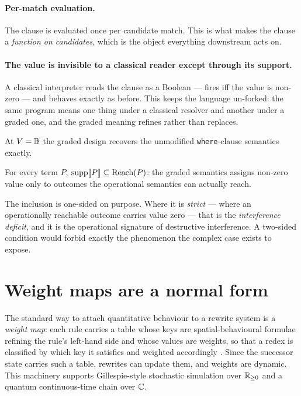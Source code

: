 \paragraph{Per-match evaluation.} The clause is evaluated once per candidate
match. This is what makes the clause a \emph{function on candidates}, which is the
object everything downstream acts on.

\paragraph{The value is invisible to a classical reader except through its
support.} A classical interpreter reads the clause as a Boolean --- fires iff the
value is non-zero --- and behaves exactly as before. This keeps the language
un-forked: the same program means one thing under a classical resolver and
another under a graded one, and the graded meaning refines rather than replaces.

\begin{theorem}[Conservativity]
\label{thm:conservativity}
At $V = \mathbb{B}$ the graded design recovers the unmodified \texttt{where}-clause
semantics exactly.
\end{theorem}

\begin{corollary}
\label{cor:support}
For every term $P$, $\mathrm{supp}\llbracket P \rrbracket \subseteq \mathrm{Reach}(P)$: the graded
semantics assigns non-zero value only to outcomes the operational semantics can
actually reach.
\end{corollary}

The inclusion is one-sided on purpose. Where it is \emph{strict} --- where an
operationally reachable outcome carries value zero --- that is the
\emph{interference deficit}, and it is the operational signature of destructive
interference. A two-sided condition would forbid exactly the phenomenon the
complex case exists to expose.

\section{Weight maps are a normal form}
\label{sec:dnf}

The standard way to attach quantitative behaviour to a rewrite system is a
\emph{weight map}: each rule carries a table whose keys are spatial-behavioural
formulae refining the rule's left-hand side and whose values are weights, so that
a redex is classified by which key it satisfies and weighted accordingly
\cite{WeightedGSLT}. Since the successor state carries such a table, rewrites can
update them, and weights are dynamic. This machinery supports Gillespie-style
stochastic simulation over $\mathbb{R}_{\ge0}$ and a quantum continuous-time chain over
$\mathbb{C}$.

